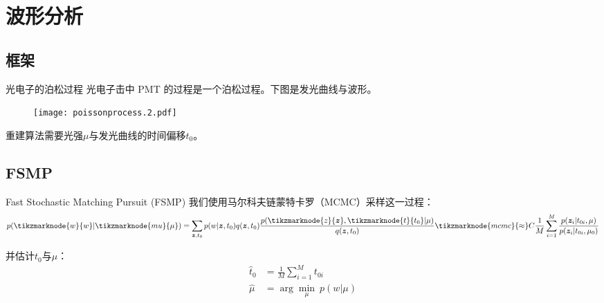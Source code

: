 \documentclass[aspectratio=169]{beamer}
\begin{document}
\section{波形分析}
\subsection{框架}
\begin{frame}{光电子的泊松过程}
    光电子击中 PMT 的过程是一个泊松过程。下图是发光曲线与波形。
    \begin{figure}
        \texttt{[image: poissonprocess.2.pdf]}
    \end{figure}
    重建算法需要光强$\mu$与发光曲线的时间偏移$t_0$。
\end{frame}

\subsection{FSMP}
\begin{frame}{Fast Stochastic Matching Pursuit (FSMP)}
    我们使用马尔科夫链蒙特卡罗（MCMC）采样这一过程：
    \vspace{8pt}
    \begin{equation}
        p(\tikzmarknode{w}{w}|\tikzmarknode{mu}{\mu})=\sum_{\bm{z},t_0}p(w|\bm{z},t_0)q(\bm{z},t_0)\frac{p(\tikzmarknode{z}{\bm{z}},\tikzmarknode{t}{t_0}|\mu)}{q(\bm{z},t_0)}\tikzmarknode{mcmc}{\approx} C \frac{1}{M}\sum_{i=1}^M\frac{p(\bm{z}_i|t_{0i},\mu)}{p(\bm{z}_i|t_{0i},\mu_0)}
    \end{equation}
    并估计$t_0$与$\mu$：
    \begin{equation}
        \begin{aligned}
            \hat{t}_0 & =\frac{1}{M}\sum_{i=1}^M t_{0i}     \\
            \hat{\mu} & =\arg\underset{\mu}{\min} ~p(w|\mu)
        \end{aligned}
    \end{equation}
\end{frame}
\end{document}
